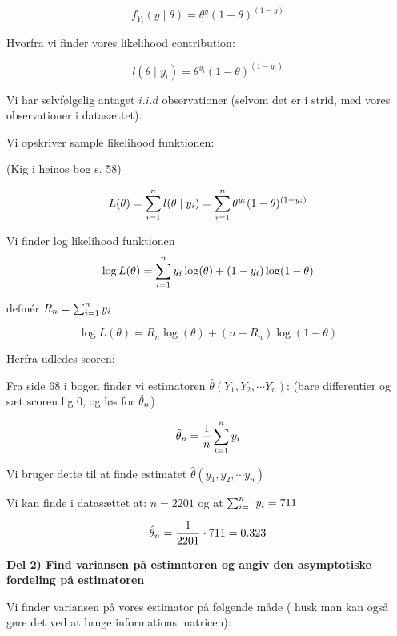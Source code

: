 \begin{equation}
    f_{Y_i}(y \mid \theta) = \theta^{y}(1- \theta)^{(1 - y)}
\end{equation}

Hvorfra vi finder vores likelihood contribution:

\begin{equation}
    l (\theta \mid y_i) = \theta^{y_i}(1- \theta)^{(1- y_i)}
\end{equation}

Vi har selvfølgelig antaget $i.i.d$ observationer (selvom det er i strid, med vores observationer i datasættet).

Vi opskriver sample likelihood funktionen:

(Kig i heinos bog s. 58)

\begin{equation}
    L(\theta) = \sum_{i=1}^{n} l (\theta \mid y_i) = \sum_{i=1}^{n} \theta^{y_i}(1- \theta)^{(1 - y_i)}
\end{equation}

Vi finder log likelihood funktionen
\begin{equation}
    \log L(\theta) = \sum_{i=1}^{n} y_i \log (\theta) + (1 - y_i) \log(1- \theta)
\end{equation}

definér $R_n = \sum_{i=1}^{n} y_i$

\begin{equation}
    \log L(\theta) = R_n \log (\theta) + (n - R_n) \log (1-\theta)
\end{equation}

Herfra udledes scoren:

Fra side 68 i bogen finder vi estimatoren $\hat{\theta}(Y_1, Y_2, \cdots Y_n)$:
(bare differentier og sæt scoren lig 0, og løs for  $\hat{\theta}_n$)

\begin{equation}
    \hat{\theta}_n = \frac{1}{n} \sum_{i=1}^{n} y_i
\end{equation}

Vi bruger dette til at finde estimatet $\hat{\theta}(y_1, y_2, \cdots y_n)$

Vi kan finde i datasættet at:
$n = 2201$ og at $\sum_{i=1}^{n} y_i = 711$

\begin{equation}
    \hat{\theta}_n = \frac{1}{2201} \cdot 711 = 0.323
\end{equation}

\textbf{Del 2) Find variansen på estimatoren og angiv den asymptotiske fordeling på estimatoren}

Vi finder variansen på vores estimator på følgende måde ( husk man kan også gøre det ved at bruge informations matricen):


